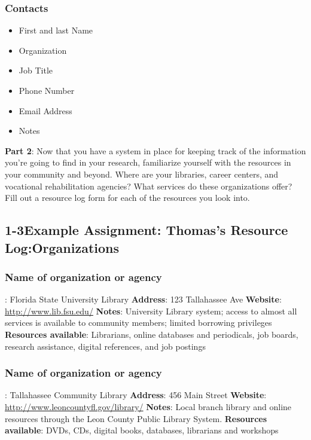 \subsubsection*{Contacts}
\begin{itemize}[leftmargin=1.0cm]
	\item First and last Name
	\item Organization
	\item Job Title
	\item Phone Number
	\item Email Address
	\item Notes
\end{itemize}
\pagebreak \textbf{Part 2}: Now that you have a system in place for keeping track of the information you're going to find in your research, familiarize yourself with the resources in your community and beyond. Where are your libraries, career centers, and vocational rehabilitation agencies? What services do these organizations offer? Fill out a resource log form for each of the resources you look into.

\pagebreak \subsection*{1-3\quad Example Assignment: Thomas's Resource Log:Organizations}
\subsubsection*{Name of organization or agency}: Florida State University Library
\break \textbf{Address}: 123 Tallahassee Ave
\break \textbf{Website}: \href{http://www.lib.fsu.edu/}{http://www.lib.fsu.edu/}
\break \textbf{Notes}: University Library system; access to almost all services is available to community members; limited borrowing privileges
\break \textbf{Resources available}: Librarians, online databases and periodicals, job boards, research assistance, digital references, and job postings

\subsubsection*{Name of organization or agency}: Tallahassee Community Library
\break \textbf{Address}: 456 Main Street
\break \textbf{Website}: \href{http://www.leoncountyfl.gov/library/}{http://www.leoncountyfl.gov/library/}
\break \textbf{Notes}: Local branch library and online resources through the Leon County Public Library System.
\break \textbf{Resources available}: DVDs, CDs, digital books, databases, librarians and workshops

